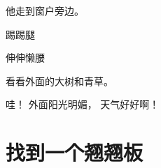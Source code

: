\newpage
{} %
{\linespread{1.5}\fontsize{18}{18}\selectfont
\vspace*{2cm}
他走到窗户旁边。 \par
}
\vspace*{15pt}
\begin{adjustbox}{angle=18}
{\linespread{1.1}\fontsize{28}{28}\selectfont
踢踢腿
\par}
\end{adjustbox}
\begin{adjustbox}{angle=18}
{\linespread{1.1}\fontsize{28}{28}\selectfont
伸伸懒腰
\par}
\end{adjustbox}
{\linespread{1.1}\fontsize{28}{28}\selectfont
看看外面的大树和青草。
\par}
\vspace*{5pt}
{\linespread{1.5}\fontsize{18}{18}\selectfont
哇！ 外面阳光明媚， 天气好好啊！
\par}
\ClearShipoutPicture





\chapter{找到一个翘翘板}

